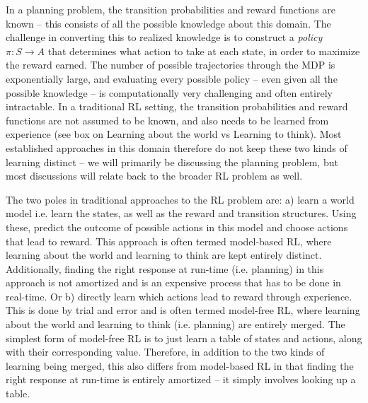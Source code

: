 In a planning problem, the transition probabilities and reward functions are known -- this consists of all the possible knowledge about this domain. The challenge in converting this to realized knowledge is to construct a \textit{policy} $\pi: S \rightarrow A$ that determines what action to take at each state, in order to maximize the reward earned. The number of possible trajectories through the MDP is exponentially large, and evaluating every possible policy -- even given all the possible knowledge -- is computationally very challenging and often entirely intractable. In a traditional RL setting, the transition probabilities and reward functions are not assumed to be known, and also needs to be learned from experience (see box on Learning about the world vs Learning to think). Most established approaches in this domain therefore do not keep these two kinds of learning distinct -- we will primarily be discussing the planning problem, but most discussions will relate back to the broader RL problem as well.


The two poles in traditional approaches to the RL problem are: a) learn a world model i.e. learn the states, as well as the reward and transition structures. Using these, predict the outcome of possible actions in this model and choose actions that lead to reward. This approach is often termed model-based RL, where learning about the world and learning to think are kept entirely distinct. Additionally, finding the right response at run-time (i.e. planning) in this approach is not amortized and is an expensive process that has to be done in real-time. Or b) directly learn which actions lead to reward through experience. This is done by trial and error and is often termed model-free RL, where learning about the world and learning to think (i.e. planning) are entirely merged. The simplest form of model-free RL is to just learn a table of states and actions, along with their corresponding value. Therefore, in addition to the two kinds of learning being merged, this also differs from model-based RL in that finding the right response at run-time is entirely amortized -- it simply involves looking up a table.

